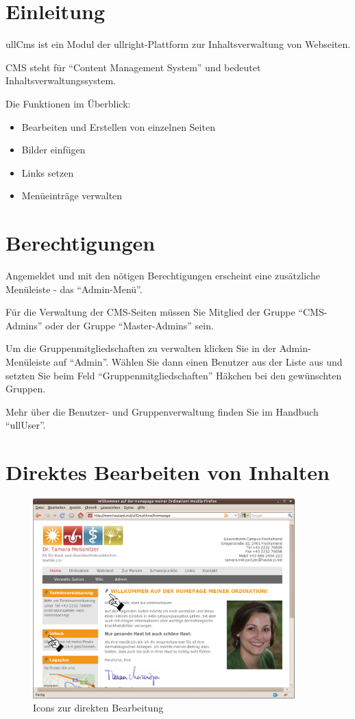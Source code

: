 \documentclass[article, a4paper, oneside, 11pt]{memoir}
\begin{document}
\section{Einleitung}
ullCms ist ein Modul der ullright-Plattform zur Inhaltsverwaltung von Webseiten. 

CMS steht für "`Content Management System"' und bedeutet Inhaltsverwaltungssystem.

Die Funktionen im Überblick:

\begin{itemize}
\item Bearbeiten und Erstellen von einzelnen Seiten
\item Bilder einfügen
\item Links setzen
\item Menüeinträge verwalten
\end{itemize}




\section{Berechtigungen}

Angemeldet und mit den nötigen Berechtigungen erscheint eine zusätzliche Menüleiste - das "`Admin-Menü"'. 

Für die Verwaltung der CMS-Seiten müssen Sie Mitglied der Gruppe "`CMS-Admins"' oder der Gruppe "`Master-Admins"' sein.

Um die Gruppenmitgliedschaften zu verwalten klicken Sie in der Admin-Menüleiste auf "`Admin"'. Wählen Sie dann einen Benutzer aus der Liste aus und setzten Sie beim Feld "`Gruppenmitgliedschaften"' Häkchen bei den gewünschten Gruppen.

Mehr über die Benutzer- und Gruppenverwaltung finden Sie im Handbuch "`ullUser"'.


\section{Direktes Bearbeiten von Inhalten}

\begin{figure}[htp]
\centering
\includegraphics[width=0.9\textwidth]{direct_edit}
\caption{Icons zur direkten Bearbeitung}
\label{fig:direct_edit}
\end{figure}
\end{document}
